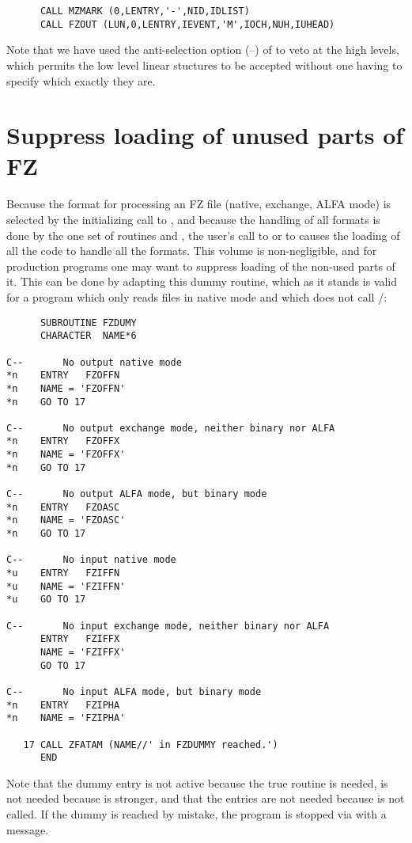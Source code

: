 {\begin{verbatim}
      CALL MZMARK (0,LENTRY,'-',NID,IDLIST)
      CALL FZOUT (LUN,0,LENTRY,IEVENT,'M',IOCH,NUH,IUHEAD)
\end{verbatim}

Note that we have used the anti-selection option (--) of 
to veto at the high levels,
which permits the low level linear stuctures to be accepted without
one having to specify which exactly they are.

\section{Suppress loading of unused parts of FZ}

Because the format for processing an FZ file
(native, exchange, ALFA mode)
is selected by the initializing call to ,
and because the handling of all formats is done
by the one set of routines  and ,
the user's call to  or to  causes the loading
of all the code to handle all the formats.
This volume is non-negligible,
and for production programs one may want to suppress
loading of the non-used parts of it.
This can be done by adapting this dummy routine,
which as it stands is valid for a program which only
reads files in native mode and which does not call
/:

\begin{verbatim}
      SUBROUTINE FZDUMY
      CHARACTER  NAME*6

C--       No output native mode
*n    ENTRY   FZOFFN
*n    NAME = 'FZOFFN'
*n    GO TO 17

C--       No output exchange mode, neither binary nor ALFA
*n    ENTRY   FZOFFX
*n    NAME = 'FZOFFX'
*n    GO TO 17

C--       No output ALFA mode, but binary mode
*n    ENTRY   FZOASC
*n    NAME = 'FZOASC'
*n    GO TO 17

C--       No input native mode
*u    ENTRY   FZIFFN
*u    NAME = 'FZIFFN'
*u    GO TO 17

C--       No input exchange mode, neither binary nor ALFA
      ENTRY   FZIFFX
      NAME = 'FZIFFX'
      GO TO 17

C--       No input ALFA mode, but binary mode
*n    ENTRY   FZIPHA
*n    NAME = 'FZIPHA'

   17 CALL ZFATAM (NAME//' in FZDUMMY reached.')
      END
\end{verbatim}

Note that the dummy entry  is not active because
the true routine is needed,  is not needed because
 is stronger, and that the entries  are not
needed because  is not called.
If the dummy is reached by mistake, the program is stopped
via  with a message.

}
